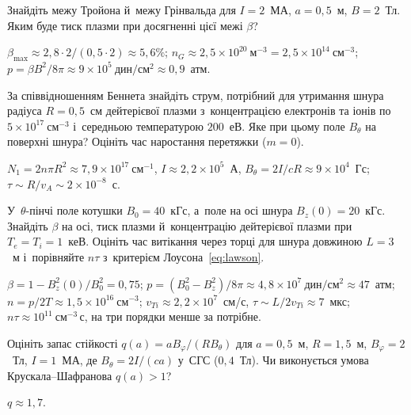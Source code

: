 \begin{problem}\label{prb:Troyon}
	Знайдіть межу Тройона й~межу Грінвальда для $I=2$~МА, $a=0{,}5$~м, $B=2$~Тл. Яким буде
	тиск плазми при досягненні цієї межі $\beta$?
	\begin{solution}
		$\beta_{\max}\approx2{,}8\cdot2/(0{,}5\cdot2)\approx5{,}6\%$; $n_G\approx2{,}5\times10^{20}~\mathrm{м}^{-3}=2{,}5\times10^{14}~\mathrm{см}^{-3}$;
	$p=\beta B^2/8\pi\approx9\times10^5~\mathrm{дин/см^2}\approx0{,}9$~атм.
	\end{solution}
\end{problem}

\begin{problem}\label{prb:PlasmaBennett}
	За співвідношенням Беннета знайдіть струм, потрібний для утримання шнура радіуса
	$R=0{,}5$~см дейтерієвої плазми з~концентрацією електронів та іонів по $5\times10^{17}~\mathrm{см}^{-3}$ і~середньою
	температурою $200$~еВ. Яке при цьому поле $B_\theta$ на поверхні шнура? Оцініть час
	наростання перетяжки ($m=0$).
	\begin{solution}
		$N_1=2n\pi R^2\approx7{,}9\times10^{17}~\mathrm{см}^{-1}$, $I\approx2{,}2\times10^{5}$~А,
	$B_\theta=2I/cR\approx9\times10^{4}$~Гс; $\tau\sim R/v_A\sim2\times10^{-8}$~с.
	\end{solution}
\end{problem}

\begin{problem}\label{prb:ThetaPinch}
	У~$\theta$-пінчі поле котушки $B_0=40$~кГс, а~поле на осі шнура $B_z(0)=20$~кГс.
	Знайдіть $\beta$ на осі, тиск плазми й~концентрацію дейтерієвої плазми при
	$T_e=T_i=1$~кеВ. Оцініть час витікання через торці для шнура довжиною $L=3$~м
	і~порівняйте $n\tau$ з~критерієм Лоусона~\eqref{eq:lawson}.
	\begin{solution}
		$\beta=1-B_z^2(0)/B_0^2=0{,}75$; $p=(B_0^2-B_z^2)/8\pi\approx4{,}8\times10^7~\mathrm{дин/см^2}\approx47$~атм;
	$n=p/2T\approx1{,}5\times10^{16}~\mathrm{см}^{-3}$; $v_{Ti}\approx2{,}2\times10^7$~см/с, $\tau\sim L/2v_{Ti}\approx7$~мкс;
	$n\tau\approx10^{11}~\mathrm{см}^{-3}\,\mathrm{с}$, на три порядки менше за потрібне.
	\end{solution}
\end{problem}

\begin{problem}\label{prb:SafetyFactor}
	Оцініть запас стійкості $q(a)=aB_\varphi/(RB_\theta)$ для $a=0{,}5$~м, $R=1{,}5$~м, $B_\varphi=2$~Тл,
	$I=1$~МА, де $B_\theta=2I/(ca)$ у~СГС ($0{,}4$~Тл). Чи виконується умова Крускала--Шафранова $q(a)>1$?
	\begin{solution}
		$q\approx1{,}7$.
	\end{solution}
\end{problem}

